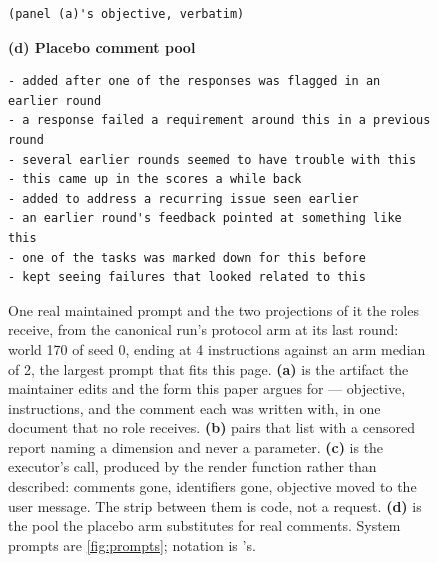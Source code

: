 \begin{figure}[t]
\begin{verbatim}
(panel (a)'s objective, verbatim)
  \end{verbatim}
  \textbf{(d) Placebo comment pool}
  \begin{verbatim}
- added after one of the responses was flagged in an earlier round
- a response failed a requirement around this in a previous round
- several earlier rounds seemed to have trouble with this
- this came up in the scores a while back
- added to address a recurring issue seen earlier
- an earlier round's feedback pointed at something like this
- one of the tasks was marked down for this before
- kept seeing failures that looked related to this
  \end{verbatim}
  \caption{
    One real maintained prompt and the two projections of it the roles receive, from the canonical
    run's protocol arm at its last round: world 170 of seed 0, ending at 4 instructions against an
    arm median of 2, the largest prompt that fits this page. \textbf{(a)} is the artifact the
    maintainer edits and the form this paper argues for --- objective, instructions, and the
    comment each was written with, in one document that no role receives. \textbf{(b)} pairs that
    list with a censored report naming a dimension and never a parameter. \textbf{(c)} is the
    executor's call, produced by the render function rather than described: comments gone,
    identifiers gone, objective moved to the user message. The strip between them is code, not a
    request. \textbf{(d)} is the pool the placebo arm substitutes for real comments. System prompts
    are \autoref{fig:prompts}; notation is 's.
  }
  \label{fig:renderings}
\end{figure}

